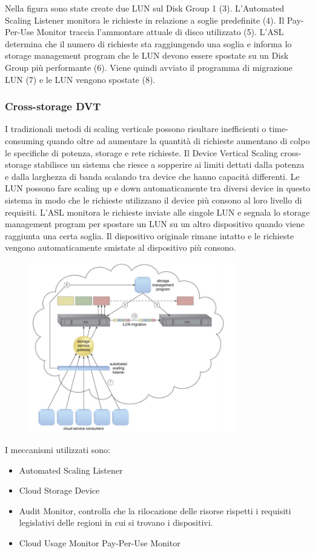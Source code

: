 Nella figura sono state create due LUN sul Disk Group 1 (3). L'Automated Scaling Listener monitora le richieste in relazione a soglie predefinite (4). Il Pay-Per-Use Monitor traccia l'ammontare attuale di disco utilizzato (5). L'ASL determina che il numero di richieste sta raggiungendo una soglia e informa lo storage management program che le LUN devono essere spostate su un Disk Group più performante (6). Viene quindi avviato il programma di migrazione LUN (7) e le LUN vengono spostate (8).

\subsubsection{Cross-storage DVT}
I tradizionali metodi di scaling verticale possono risultare inefficienti o time-consuming quando oltre ad aumentare la quantità di richieste aumentano di colpo le specifiche di potenza, storage e rete richieste. Il Device Vertical Scaling cross-storage stabilisce un sistema che riesce a sopperire ai limiti dettati dalla potenza e dalla larghezza di banda scalando tra device che hanno capacità differenti. Le LUN possono fare scaling up e down automaticamente tra diversi device in questo sistema in modo che le richieste utilizzano il device più consono al loro livello di requisiti. L'ASL monitora le richieste inviate alle singole LUN e segnala lo storage management program per spostare un LUN su un altro dispositivo quando viene raggiunta una certa soglia. Il dispositivo originale rimane intatto e le richieste vengono automaticamente smistate al dispositivo più consono.

\begin{figure}[htb!]
    \centering
    \includegraphics[width=9cm]{./Images/cap13/13.5.png}
\end{figure}

I meccanismi utilizzati sono: 
\begin{itemize}
    \item Automated Scaling Listener
    \item Cloud Storage Device
    \item Audit Monitor, controlla che la rilocazione delle risorse rispetti i requisiti legislativi delle regioni in cui si trovano i dispositivi.
    \item Cloud Usage Monitor
    Pay-Per-Use Monitor
\end{itemize}

